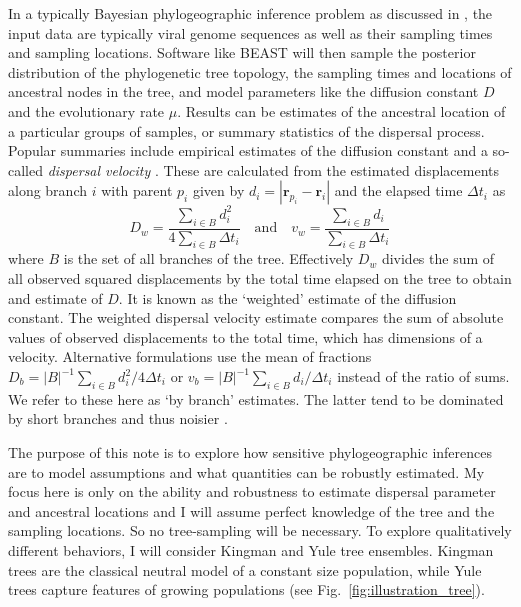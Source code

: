 \documentclass[aps,rmp, twocolumn]{revtex4}
\newcommand{\rvec}{\mathbf{r}}
\begin{document}
In a typically Bayesian phylogeographic inference problem as discussed in \citet{pybus_unifying_2012}, the input data are typically viral genome sequences as well as their sampling times and sampling locations.
Software like BEAST will then sample the posterior distribution of the phylogenetic tree topology, the sampling times and locations of ancestral nodes in the tree, and model parameters like the diffusion constant $D$ and the evolutionary rate $\mu$.
Results can be estimates of the ancestral location of a particular groups of samples, or summary statistics of the dispersal process.
Popular summaries include empirical estimates of the diffusion constant  \citep{pybus_unifying_2012} and a so-called \emph{dispersal velocity} \citep{dellicour_using_2017}. These are calculated from the estimated displacements along branch $i$ with parent $p_i$ given by $d_i = |\rvec_{p_i} - \rvec_{i}|$ and the elapsed time $\Delta t_i$ as
\begin{equation}
    \label{eq:dispersal_parameters}
    D_w = \frac{\sum_{i\in B}d_i^2}{4\sum_{i\in B} \Delta t_i} \quad \mathrm{and}  \quad v_w = \frac{\sum_{i\in B} d_i}{\sum_{i\in B} \Delta t_i}
\end{equation}
where $B$ is the set of all branches of the tree.
Effectively $D_w$ divides the sum of all observed squared displacements by the total time elapsed on the tree to obtain and estimate of $D$.
It is known as the `weighted' estimate of the diffusion constant.
The weighted dispersal velocity estimate compares the sum of absolute values of observed displacements to the total time, which has dimensions of a velocity.
Alternative formulations use the mean of fractions $D_b = |B|^{-1} \sum_{i\in B}d_i^2/4\Delta t_i$ or $v_b = |B|^{-1} \sum_{i\in B}d_i/\Delta t_i$ instead of the ratio of sums.
We refer to these here as `by branch' estimates.
The latter tend to be dominated by short branches and thus noisier \citep{trovao_bayesian_2015}.


The purpose of this note is to explore how sensitive phylogeographic inferences are to model assumptions and what quantities can be robustly estimated.
My focus here is only on the ability and robustness to estimate dispersal parameter and ancestral locations and I will assume perfect knowledge of the tree and the sampling locations.
So no tree-sampling will be necessary.
To explore qualitatively different behaviors, I will consider Kingman and Yule tree ensembles. Kingman trees are the classical neutral model of a constant size population, while Yule trees capture features of growing populations (see Fig.~\ref{fig:illustration_tree}).
\end{document}

